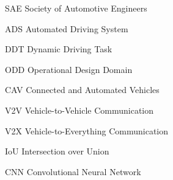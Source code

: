 \begin{abbreviations}
    \item[SAE] Society of Automotive Engineers
    \item[ADS] Automated Driving System
    \item[DDT] Dynamic Driving Task
    \item[ODD] Operational Design Domain
    \item[CAV] Connected and Automated Vehicles
    \item[V2V] Vehicle-to-Vehicle Communication
    \item[V2X] Vehicle-to-Everything Communication
    \item[IoU] Intersection over Union
    \item[CNN] Convolutional Neural Network
\end{abbreviations}

